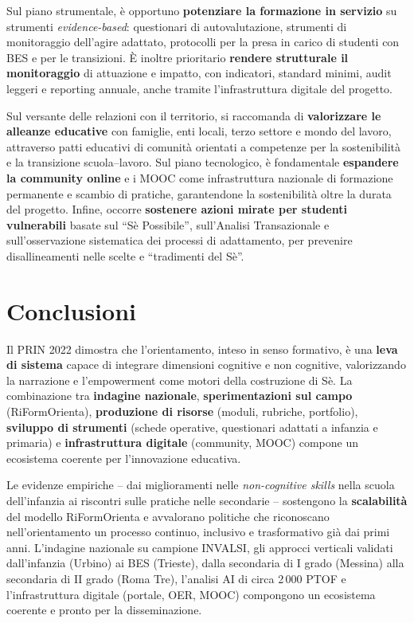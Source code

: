 \documentclass[12pt,a4paper]{article}
\begin{document}
Sul piano strumentale, \`e opportuno \textbf{potenziare la formazione in servizio} su strumenti \textit{evidence-based}: questionari di autovalutazione, strumenti di monitoraggio dell'agire adattato, protocolli per la presa in carico di studenti con BES e per le transizioni. \`E inoltre prioritario \textbf{rendere strutturale il monitoraggio} di attuazione e impatto, con indicatori, standard minimi, audit leggeri e reporting annuale, anche tramite l'infrastruttura digitale del progetto.

Sul versante delle relazioni con il territorio, si raccomanda di \textbf{valorizzare le alleanze educative} con famiglie, enti locali, terzo settore e mondo del lavoro, attraverso patti educativi di comunit\`a orientati a competenze per la sostenibilit\`a e la transizione scuola--lavoro. Sul piano tecnologico, \`e fondamentale \textbf{espandere la community online} e i MOOC come infrastruttura nazionale di formazione permanente e scambio di pratiche, garantendone la sostenibilit\`a oltre la durata del progetto. Infine, occorre \textbf{sostenere azioni mirate per studenti vulnerabili} basate sul ``S\`e Possibile'', sull'Analisi Transazionale e sull'osservazione sistematica dei processi di adattamento, per prevenire disallineamenti nelle scelte e ``tradimenti del S\`e''.


\section{Conclusioni}

Il PRIN 2022 dimostra che l'orientamento, inteso in senso formativo, \`e una \textbf{leva di sistema} capace di integrare dimensioni cognitive e non cognitive, valorizzando la narrazione e l'empowerment come motori della costruzione di S\`e. La combinazione tra \textbf{indagine nazionale}, \textbf{sperimentazioni sul campo} (RiFormOrienta), \textbf{produzione di risorse} (moduli, rubriche, portfolio), \textbf{sviluppo di strumenti} (schede operative, questionari adattati a infanzia e primaria) e \textbf{infrastruttura digitale} (community, MOOC) compone un ecosistema coerente per l'innovazione educativa.

Le evidenze empiriche -- dai miglioramenti nelle \textit{non-cognitive skills} nella scuola dell'infanzia ai riscontri sulle pratiche nelle secondarie -- sostengono la \textbf{scalabilit\`a} del modello RiFormOrienta e avvalorano politiche che riconoscano nell'orientamento un processo continuo, inclusivo e trasformativo gi\`a dai primi anni. L'indagine nazionale su campione INVALSI, gli approcci verticali validati dall'infanzia (Urbino) ai BES (Trieste), dalla secondaria di I grado (Messina) alla secondaria di II grado (Roma Tre), l'analisi AI di circa 2\,000 PTOF e l'infrastruttura digitale (portale, OER, MOOC) compongono un ecosistema coerente e pronto per la disseminazione.
\end{document}
